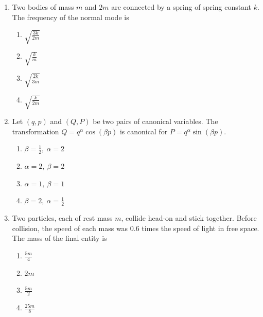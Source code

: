 \documentclass[journal,12pt,onecolumn]{IEEEtran}
\begin{document}
\begin{enumerate}
\item Two bodies of mass $m$ and $2m$ are connected by a spring of spring constant $k$. The frequency of the normal mode is   

\hfill{}

\begin{multicols}{4}
\begin{enumerate}
    \item $\sqrt{\frac{3k}{2m}}$
    \item $\sqrt{\frac{k}{m}}$
    \item $\sqrt{\frac{2k}{3m}}$
    \item $\sqrt{\frac{k}{2m}}$
\end{enumerate}
\end{multicols}

\item Let $(q,p)$ and $(Q,P)$ be two pairs of canonical variables. The transformation $Q = q^{\alpha} \cos(\beta p)$ is canonical for $P = q^{\alpha} \sin(\beta p)$.  

\hfill{}

\begin{multicols}{4}
\begin{enumerate}
    \item $\beta = \frac12, \ \alpha = 2$
    \item $\alpha = 2, \ \beta = 2$
    \item $\alpha = 1, \ \beta = 1$
    \item $\beta = 2, \ \alpha = \frac12$
\end{enumerate}
\end{multicols}

\item Two particles, each of rest mass $m$, collide head-on and stick together. Before collision, the speed of each mass was $0.6$ times the speed of light in free space. The mass of the final entity is 

\hfill{}

\begin{multicols}{4}
\begin{enumerate}
    \item $\frac{5m}{4}$
    \item $2m$
    \item $\frac{5m}{2}$
    \item $\frac{25m}{8}$
\end{enumerate}
\end{multicols}


\end{enumerate}
\end{document}
